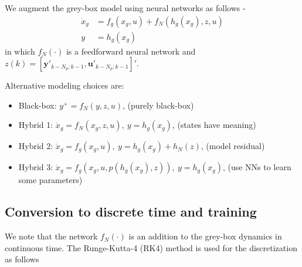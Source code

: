 \documentclass{article}
\begin{document}
We augment the grey-box model using 
neural networks as follows -
\begin{align*}
\dot x_g &= f_g(x_g, u) + 
f_N(h_g(x_g), z, u)\\
y &= h_g(x_g) 
\end{align*}
in which $f_N(\cdot)$ is a feedforward neural network
and $z(k) = [\mathbf{y}'_{k-N_p:k-1}, \mathbf{u}'_{k-N_p:k-1}]'$.

Alternative modeling choices are:
\begin{itemize}
	\item Black-box: $y^+ = f_N(y, z, u)$, (purely black-box)
	\item Hybrid 1: $\dot x_g = f_N(x_g, z, u), \ y = h_g(x_g)$, 
  (states have meaning)
  \item Hybrid 2: $\dot x_g = f_g(x_g, u), \ y = h_g(x_g) + h_N(z)$, 
	(model residual)
	\item Hybrid 3: $\dot x_g = f_g(x_g, u, p(h_g(x_g), z)), \ y = h_g(x_g)$, (use NNs to learn some parameters)
\end{itemize}


\subsection{Conversion to discrete time and training}
We note that the network $f_N(\cdot)$ is an addition 
to the grey-box dynamics in continuous time. 
The Runge-Kutta-4 (RK4) method 
is used for the discretization as follows
\end{document}
